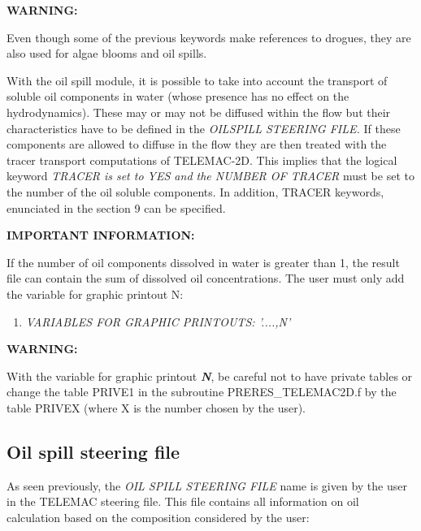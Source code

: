  \textbf{WARNING:}

 Even though some of the previous keywords make references to drogues, they are also used for algae blooms and oil spills.

 With the oil spill module, it is possible to take into account the transport of soluble oil components in water (whose presence has no effect on the hydrodynamics). These may or may not be diffused within the flow but their characteristics have to be defined in the \textit{OILSPILL STEERING FILE.} If these components are allowed to diffuse in the flow they are then treated with the tracer transport computations of TELEMAC-2D. This implies that the logical keyword \textit{TRACER is set to YES and the NUMBER OF TRACER} must be set to the number of the oil soluble components. In addition, TRACER keywords, enunciated in the section 9 can be specified.

 \textbf{IMPORTANT INFORMATION:}

 If the number of oil components dissolved in water is greater than 1, the result file can contain the sum of dissolved oil concentrations. The user must only add the variable for graphic printout N:

\begin{enumerate}
\item  \textit{VARIABLES FOR GRAPHIC PRINTOUTS: '....,N'}
\end{enumerate}

 \textbf{WARNING:}

 With the variable for graphic printout \textbf{\textit{N}}, be careful not to have private tables or change the table PRIVE1 in the subroutine PRERES\_TELEMAC2D.f by the table PRIVEX (where X is the number chosen by the user).


\subsection{ Oil spill steering file}

 As seen previously, the \textit{OIL SPILL STEERING FILE }name is given by the user in the TELEMAC steering file. This file contains all information on oil calculation based on the composition considered by the user:

